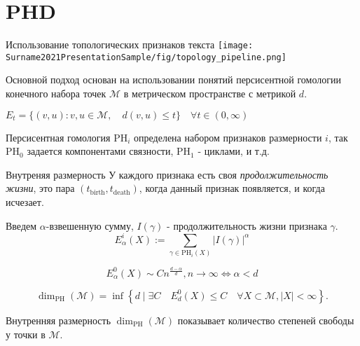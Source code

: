\documentclass{beamer}
\begin{document}
\section{PHD}
\begin{frame}{Использование топологических признаков текста}
    \texttt{[image: Surname2021PresentationSample/fig/topology\_pipeline.png]}

    Основной подход основан на использовании понятий персисентной гомологии конечного набора точек $\mathcal{M}$ в метрическом пространстве с метрикой $d$.

    $E_t = \{(v, u): v, u \in \mathcal{M}, \quad d(v, u) \leq t\} \quad \forall t \in (0, \infty)$

    Персисентная гомология $\text{PH}_i$ определена набором признаков размерности $i$, так $\text{PH}_0$ задается компонентами связности, $\text{PH}_1$ - циклами, и т.д. 
    

\end{frame}
\begin{frame}{Внутреняя размерность}
  У каждого признака есть своя \textit{продолжительность жизни}, это пара $(t_\text{birth}, t_\text{death})$, когда данный признак появляется, и когда исчезает.
  
Введем $\alpha$-взвешенную сумму, $I(\gamma)$ - продолжительность жизни признака $\gamma$.
\begin{equation}
    E_\alpha^i(X):=\sum_{\gamma \in \mathrm{PH}_i(X)}|I(\gamma)|^\alpha
\end{equation}

\begin{equation}
E_\alpha^0(X) \sim C n^{\frac{d-\alpha}{d}},  n\rightarrow \infty  \Leftrightarrow \alpha<d
\end{equation}

\begin{equation}
    \operatorname{dim}_{\mathrm{PH}}(\mathcal{M})=\inf \left\{d \mid \exists C \quad E_d^0(X) \leq C \quad \forall  X \subset \mathcal{M}, |X| < \infty \right\}.
\end{equation}

\begin{tcolorbox}[colback=white,colframe=skyblue,title=Гипотеза]
    Внутренняя размерность $\operatorname{dim}_{\mathrm{PH}}(\mathcal{M})$ показывает количество степеней свободы у точки в $\mathcal{M}$.
\end{tcolorbox}

\end{frame}
\end{document}
